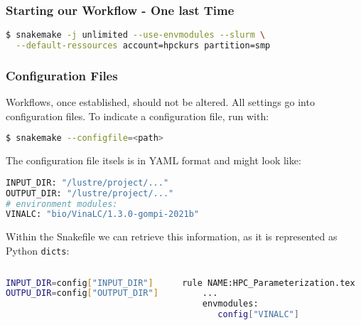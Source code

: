 \begin{frame}[fragile]
  \frametitle{Starting our Workflow - One last Time}
  \begin{lstlisting}[language=Bash,style=Shell]
$ snakemake -j unlimited --use-envmodules --slurm \
  --default-ressources account=hpckurs partition=smp
  \end{lstlisting}
\end{frame}

\begin{frame}[fragile]
  \frametitle{Configuration Files}
  Workflows, once established, should not be altered. All settings go into configuration files. To indicate a configuration file, run with:
  \begin{lstlisting}[language=Bash,style=Shell]
$ snakemake --configfile=<path>
  \end{lstlisting}\pause
  The configuration file itsels is in YAML format and might look like:
  \begin{lstlisting}[language=Python,style=Python]
INPUT_DIR: "/lustre/project/..."
OUTPUT_DIR: "/lustre/project/..."
# environment modules:
VINALC: "bio/VinaLC/1.3.0-gompi-2021b"
  \end{lstlisting}\pause
    Within the Snakefile we can retrieve this information, as it is represented as Python \texttt{dicts}:
  \begin{columns}
     \begin{column}{0.5\textwidth}
       \begin{lstlisting}[language=Bash,style=Shell,basicstyle=\small]
INPUT_DIR=config["INPUT_DIR"]
OUTPU_DIR=config["OUTPUT_DIR"]
       \end{lstlisting}
     \end{column}
     \begin{column}{0.5\textwidth}
      \begin{lstlisting}[language=Bash,style=Shell,basicstyle=\small] 
rule NAME:HPC_Parameterization.tex
    ...
    envmodules:
       config["VINALC"]    
      \end{lstlisting}

     \end{column}
  \end{columns}

\end{frame}



